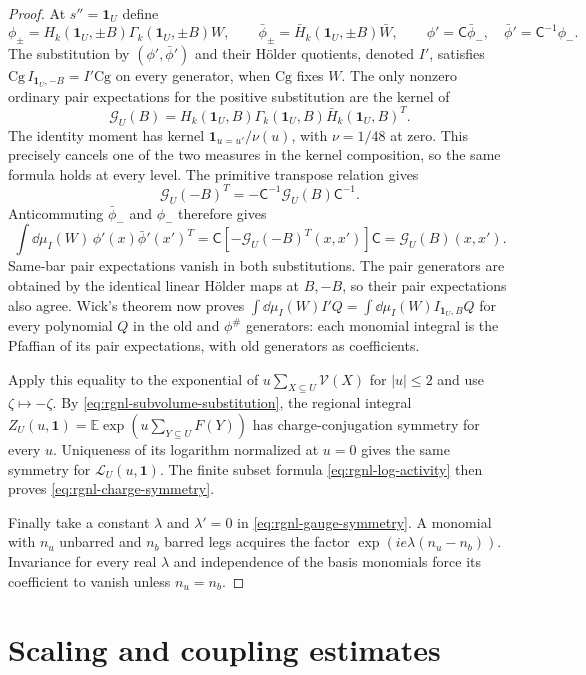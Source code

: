 \begin{proof}
At $s''=\mathbf1_U$ define
\[
 \phi_\pm=H_k(\mathbf1_U,\pm B)\Gamma_k(\mathbf1_U,\pm B)W,
 \qquad
 \bar\phi_\pm=\bar H_k(\mathbf1_U,\pm B)\bar W,
 \qquad
 \phi'=\mathsf C\bar\phi_-,\quad
 \bar\phi'=\mathsf C^{-1}\phi_-.
\]
The substitution by $(\phi',\bar\phi')$ and their
H\"older quotients, denoted $I'$, satisfies
$\mathrm{Cg}\,I_{\mathbf1_U,-B}=I'\mathrm{Cg}$
on every generator, when $\mathrm{Cg}$ fixes $W$.
The only nonzero ordinary pair expectations for the
positive substitution are the kernel of
\[
 \mathcal G_U(B)
        =H_k(\mathbf1_U,B)\Gamma_k(\mathbf1_U,B)
                                            \bar H_k(\mathbf1_U,B)^T.
\]
The identity moment has kernel
$\mathbf1_{u=u'}/\nu(u)$, with $\nu=1/48$ at zero.
This precisely cancels one of the two measures in
the kernel composition, so the same formula holds
at every level. The primitive transpose relation gives
\[
 \mathcal G_U(-B)^T
                      =-\mathsf C^{-1}\mathcal G_U(B)\mathsf C^{-1}.
\]
Anticommuting $\bar\phi_-$ and $\phi_-$ therefore gives
\[
 \int\dd\mu_I(W)\,\phi'(x)\bar\phi'(x')^T
     =\mathsf C[-\mathcal G_U(-B)^T(x,x')]\mathsf C
     =\mathcal G_U(B)(x,x').
\]
Same-bar pair expectations vanish in both substitutions.
The pair generators are obtained by the identical
linear H\"older maps at $B,-B$, so their pair expectations
also agree. Wick's theorem now proves
$\int\dd\mu_I(W)I'Q=\int\dd\mu_I(W)I_{\mathbf1_U,B}Q$
for every polynomial $Q$ in the old and $\phi^\#$
generators: each monomial integral is the Pfaffian of
its pair expectations, with old generators as coefficients.

Apply this equality to the exponential of
$u\sum_{X\subseteq U}\mathcal V(X)$ for $|u|\le2$ and use
$\zeta\mapsto-\zeta$. By
\eqref{eq:rgnl-subvolume-substitution}, the regional integral
$Z_U(u,\mathbf1)=\mathbb E\exp(u\sum_{Y\subseteq U}F(Y))$
has charge-conjugation symmetry for every $u$.
Uniqueness of its logarithm normalized at $u=0$ gives the
same symmetry for $\mathcal L_U(u,\mathbf1)$.
The finite subset formula \eqref{eq:rgnl-log-activity}
then proves \eqref{eq:rgnl-charge-symmetry}.

Finally take a constant $\lambda$ and $\lambda'=0$
in \eqref{eq:rgnl-gauge-symmetry}. A monomial with
$n_u$ unbarred and $n_b$ barred legs acquires the factor
$\exp(ie\lambda(n_u-n_b))$. Invariance for every real
$\lambda$ and independence of the basis monomials force
its coefficient to vanish unless $n_u=n_b$.
\end{proof}

\section{Scaling and coupling estimates}
\label{subsec:rgnl-scaled-correction}

